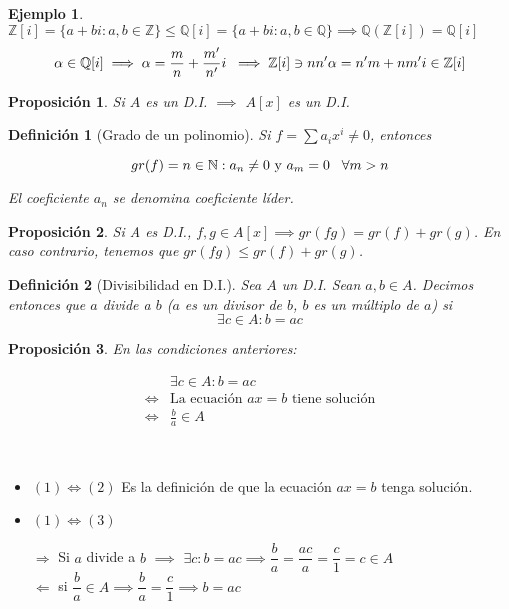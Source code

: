 \documentclass[11pt, a4paper, titlepage]{article}
\makeatletter
\newif\IfInSansMode
\let\oldsf\sffamily
\renewcommand*{\sffamily}{\oldsf\mathversion{sans}\InSansModetrue}
\let\oldnorm\normalfont
\renewcommand*{\normalfont}{\oldnorm\InSansModefalse\mathversion{normal}}
\renewenvironment{proof}[1][\proofname] {\vspace{-15pt}\par\pushQED{\qed}\normalfont\topsep6\p@\@plus6\p@\relax\trivlist\item[\hskip\labelsep\it#1\@addpunct{.}]\ignorespaces}{\popQED\endtrivlist\@endpefalse}
\providecommand{\ent}{\mathbb{Z}}
\providecommand{\rac}{\mathbb{Q}}
\renewenvironment{proof}[1][\proofname] {\par\pushQED{\qed}\normalfont\topsep6\p@\@plus6\p@\relax\trivlist\item[\hskip\labelsep\itshape\sffamily#1\@addpunct{.}]\ignorespaces}{\popQED\endtrivlist\@endpefalse}
\theoremstyle{theorem-style}
\newtheorem{nprop}{Proposición}[section]
\theoremstyle{definition-style}
\newtheorem{ndef}{Definición}[section]
\theoremstyle{remark-style}
\theoremstyle{example-style}
\newtheorem{ejemplo}{Ejemplo}[section]
\makeatother
\begin{document}
\begin{ejemplo}
  $\ent[i] = \{a+bi : a,b\in \ent\} \le \rac[i] = \{a+bi : a,b\in \rac\} \implies \rac(\ent[i]) = \rac[i]$
  \[
    \alpha\in\rac[i]\implies\alpha=\frac{m}{n}+\frac{m'}{n'}i\; \implies \ent[i] \ni nn'\alpha = n'm+nm'i \in \ent[i]\notag
  \]
\end{ejemplo}

\begin{nprop}
	Si $A$ es un D.I. $\implies$ $A[x]$ es un D.I.
\end{nprop}

\begin{ndef}[Grado de un polinomio]

  Si $f=\sum a_i x^i \neq 0$, entonces

  $$gr(f)=n\in \mathbb{N} : a_n\neq 0 \text{ y } a_m=0 \hspace{0.3cm} \forall m>n$$

El coeficiente $a_n$ se denomina coeficiente líder.

\end{ndef}

\begin{nprop}
	Si A es D.I., $f,g \in A[x]\implies gr(fg) = gr(f)+gr(g)$.
	En caso contrario, tenemos que $gr(fg) \le gr(f)+gr(g)$.
\end{nprop}

\begin{ndef}[Divisibilidad en D.I.]

Sea $A$ un D.I. Sean $a,b\in A$. Decimos entonces que $a$ divide a $b$ ($a$ es un divisor de $b$, $b$ es un múltiplo de $a$) si
\[
	\exists c \in A : b = ac
\]
\end{ndef}

\begin{nprop}
  En las condiciones anteriores:

\begin{align}
	&\exists c \in A : b = ac
\\
	\iff& \text{La ecuación } ax=b \text{ tiene solución}
\\
\iff& \frac{b}{a} \in A
\end{align}
\end{nprop}

\begin{proof}\hfill\\
  \begin{itemize}
  \item $\boxed{(1) \iff (2)}$ Es la definición de que la ecuación $ax = b$ tenga solución.
  \item $\boxed{(1) \iff (3)}$

    $\boxed{\Longrightarrow}$ Si $a$ divide a $b$ $\implies$ $\exists c: b=ac \implies \dfrac{b}{a} = \dfrac{ac}{a} = \dfrac{c}{1} = c \in A$\\
    $\boxed{\Longleftarrow}$ si $\dfrac{b}{a}\in A \implies \dfrac{b}{a} = \dfrac{c}{1} \implies b = ac$
  \end{itemize}

\end{proof}
\end{document}
